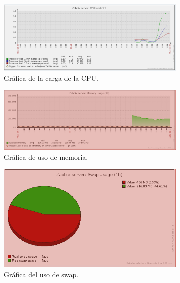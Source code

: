 \begin{figure}[H] 
  \begin{subfigure}[b]{0.5\linewidth}
    \centering
    \includegraphics[width=0.95\linewidth]{imagenes/g1} 
    \caption{Gráfica de la carga de la CPU.} 
    \vspace{4ex}
  \end{subfigure}%
  \begin{subfigure}[b]{0.5\linewidth}
    \centering
    \includegraphics[width=0.95\linewidth]{imagenes/g2} 
    \caption{Gráfica de uso de memoria.} 
    \vspace{4ex}
  \end{subfigure} 
  \begin{subfigure}[b]{0.5\linewidth}
    \centering
    \includegraphics[width=0.95\linewidth]{imagenes/g3} 
    \caption{Gráfica del uso de swap.} 
  \end{subfigure}%
  \begin{subfigure}[b]{0.5\linewidth}

\end{subfigure}
\end{figure}
